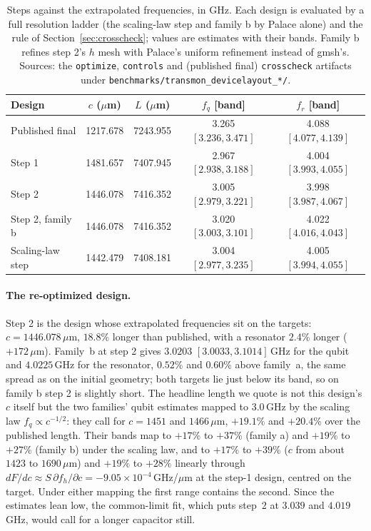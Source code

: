 \documentclass{anvil-paper}
\begin{document}
\begin{table}[htbp]
  \centering
  \caption{Steps against the extrapolated frequencies, in GHz. Each design
  is evaluated by a full resolution ladder (the scaling-law step and
  family b by Palace alone) and the rule of
  Section~\ref{sec:crosscheck}; values are estimates with their bands.
  Family b refines step 2's $h$ mesh with Palace's uniform refinement
  instead of gmsh's. Sources: the \texttt{optimize}, \texttt{controls} and
  (published final) \texttt{crosscheck} artifacts under
  \texttt{benchmarks/transmon\_devicelayout\_*/}.}
  \label{tab:newton-conv}
  \footnotesize
  \begin{tabular}{@{}lcccc@{}}
    \toprule
    Design & $c$ ($\mu$m) & $L$ ($\mu$m) & $f_q$ [band] & $f_r$ [band] \\
    \midrule
    Published final & 1217.678 & 7243.955 & 3.265 $[3.236, 3.471]$ & 4.088 $[4.077, 4.139]$ \\
    Step 1 & 1481.657 & 7407.945 & 2.967 $[2.938, 3.188]$ & 4.004 $[3.993, 4.055]$ \\
    Step 2 & 1446.078 & 7416.352 & 3.005 $[2.979, 3.221]$ & 3.998 $[3.987, 4.067]$ \\
    Step 2, family b & 1446.078 & 7416.352 & 3.020 $[3.003, 3.101]$ & 4.022 $[4.016, 4.043]$ \\
    Scaling-law step & 1442.479 & 7408.181 & 3.004 $[2.977, 3.235]$ & 4.005 $[3.994, 4.055]$ \\
    \bottomrule
  \end{tabular}
\end{table}

\paragraph{The re-optimized design.}
Step 2 is the design whose extrapolated frequencies sit on the targets:
$c = 1446.078\,\mu$m, $18.8\%$ longer than published, with a resonator
$2.4\%$ longer ($+172\,\mu$m). Family~b at step 2 gives
$3.0203$ $[3.0033, 3.1014]$\,GHz for the qubit and $4.0225$\,GHz for the
resonator, $0.52\%$ and $0.60\%$ above family~a, the same spread as
on the initial geometry; both targets lie just below its band, so on family
b step 2 is slightly short. The headline length we quote is not this
design's $c$ itself but the two families' qubit estimates mapped to
$3.0$\,GHz by the scaling law $f_q \propto c^{-1/2}$: they call for $c =
1451$ and $1466\,\mu$m, $+19.1\%$ and $+20.4\%$ over the published length. Their
bands map to $+17\%$ to $+37\%$ (family a) and $+19\%$ to $+27\%$
(family b) under the scaling law, and to $+17\%$ to $+39\%$ ($c$ from about
$1423$ to $1690\,\mu$m) and $+19\%$ to $+28\%$ linearly through $dF/dc
\approx S\,\partial f_h/\partial c = -9.05\times10^{-4}$\,GHz/$\mu$m at
the step-1 design, centred on the target. Under either mapping the first
range contains the second. Since the estimates lean low, the common-limit
fit, which puts step~2 at $3.039$ and $4.019$\,GHz, would call for a longer
capacitor still.
\end{document}
